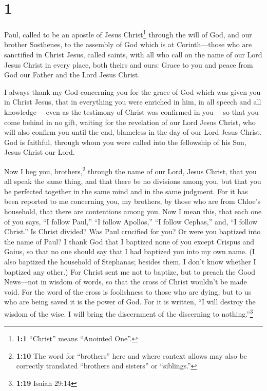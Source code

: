 \hypertarget{section}{%
\section{1}\label{section}}

 Paul, called to be an apostle of Jesus Christ\footnote{\textbf{1:1}
  ``Christ'' means ``Anointed One''.} through the will of God, and our
brother Sosthenes,  to the assembly of God which is at
Corinth---those who are sanctified in Christ Jesus, called saints, with
all who call on the name of our Lord Jesus Christ in every place, both
theirs and ours:  Grace to you and peace from God our
Father and the Lord Jesus Christ.

 I always thank my God concerning you for the grace of God
which was given you in Christ Jesus,  that in everything
you were enriched in him, in all speech and all knowledge---
 even as the testimony of Christ was confirmed in you---
 so that you come behind in no gift, waiting for the
revelation of our Lord Jesus Christ,  who will also
confirm you until the end, blameless in the day of our Lord Jesus
Christ.  God is faithful, through whom you were called
into the fellowship of his Son, Jesus Christ our Lord.

 Now I beg you, brothers,\footnote{\textbf{1:10} The word
  for ``brothers'' here and where context allows may also be correctly
  translated ``brothers and sisters'' or ``siblings.''} through the name
of our Lord, Jesus Christ, that you all speak the same thing, and that
there be no divisions among you, but that you be perfected together in
the same mind and in the same judgment.  For it has been
reported to me concerning you, my brothers, by those who are from
Chloe's household, that there are contentions among you. 
Now I mean this, that each one of you says, ``I follow Paul,'' ``I
follow Apollos,'' ``I follow Cephas,'' and, ``I follow Christ.''
 Is Christ divided? Was Paul crucified for you? Or were
you baptized into the name of Paul?  I thank God that I
baptized none of you except Crispus and Gaius,  so that
no one should say that I had baptized you into my own name.
 (I also baptized the household of Stephanas; besides
them, I don't know whether I baptized any other.)  For
Christ sent me not to baptize, but to preach the Good News---not in
wisdom of words, so that the cross of Christ wouldn't be made void.
 For the word of the cross is foolishness to those who
are dying, but to us who are being saved it is the power of God.
 For it is written, ``I will destroy the wisdom of the
wise. I will bring the discernment of the discerning to
nothing.''\footnote{\textbf{1:19} Isaiah 29:14}

